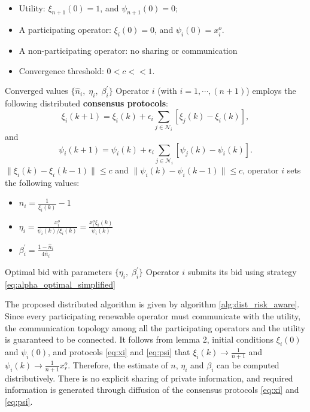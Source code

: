 \documentclass[conference]{IEEEtran}
\begin{document}
\begin{algorithm}[hbt]
\caption{Distributed Risk-Aware Nash Optimization}
\label{alg:dist_risk_aware}
\begin{algorithmic}[1]
\Require \\
\begin{itemize}
    \item Utility: $\xi_{n+1}(0)=1$, and $\psi_{n+1}(0)=0$;
    \item A participating operator: $\xi_i(0)=0$, and $\psi_i(0)=x_i^o$.
    \item A non-participating operator: no sharing or communication
    \item Convergence threshold: $0<c<<1$.
\end{itemize}
\Ensure Converged values $\{\hat{n}_i, \; \eta_i, \; \beta_i^{\prime}\}$
\State Operator $i$ (with $i=1,\cdots,(n+1)$) employs the following distributed {\bf consensus protocols}:
\begin{equation}
    \xi_i(k+1) = \xi_i(k) + \epsilon_i \sum_{j \in \mathcal{N}_i} [\xi_j(k) - \xi_i(k)], \label{eq:xi}
\end{equation} 
and 
\begin{equation} 
\psi_i(k+1) = \psi_i(k) + \epsilon_i \sum_{j \in \mathcal{N}_i} [\psi_j(k) - \psi_i(k)]. \label{eq:psi}
\end{equation} 
 {$\|\xi_i(k)-\xi_i(k-1)\|\leq c$ and $\|\psi_i(k)-\psi_i(k-1)\|\leq c$}, operator $i$ sets the following values: 
\begin{itemize}
    \item $\hat{n}_i = \frac{1}{\xi_i(k)}-1$
    \item $\eta_i = \frac{x_i^o}{\psi_i(k)/\xi_i(k)}=\frac{x_i^o\xi_i(k)}{\psi_i(k)}$
    \item $\beta_i^{\prime} = \frac{1-\hat{n}_i}{4\hat{n}_i}$
\end{itemize}
\Ensure Optimal bid with parameters $\{\eta_i, \; \beta_i^{\prime}\}$
\State Operator $i$ submits its bid using strategy \eqref{eq:alpha_optimal_simplified} 
\end{algorithmic}
\end{algorithm}

The proposed distributed algorithm is given by algorithm \ref{alg:dist_risk_aware}. Since every participating renewable operator must communicate with the utility, the communication topology among all the participating operators and the utility is guaranteed to be connected. It follows from lemma 2, initial conditions $\xi_i(0)$ and $\psi_i(0)$, and protocols \eqref{eq:xi} and \eqref{eq:psi} that $\xi_i(k)\rightarrow \frac{1}{n+1}$ and $\psi_i(k)\rightarrow \frac{1}{n+1}x_r^o$. Therefore, the estimate of $n$, $\eta_i$ and $\beta_i$ can be computed distributively. There is no explicit sharing of private information, and required information is generated through diffusion of the consensus protocols \eqref{eq:xi} and \eqref{eq:psi}.
\end{document}
